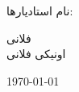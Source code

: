 \begin{titlepage}
\vspace*{2\baselineskip} 

\begin{minipage}{0.4\textwidth}
\begin{flushright} \large
نام استادیار‌ها:
\end{flushright}
\begin{center} \large
فلانی\\
اونیکی فلانی
\end{center}
\end{minipage}

\vfill

\today \large

\end{titlepage}